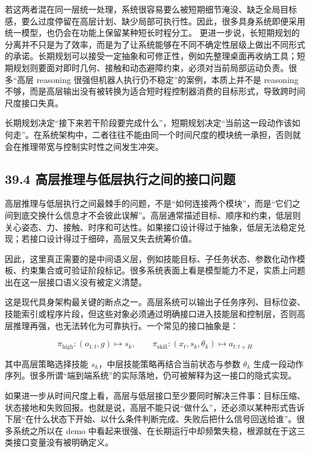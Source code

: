 若这两者混在同一层统一处理，系统很容易要么被短期细节淹没、缺乏全局目标感，要么过度停留在高层计划、缺少局部可执行性。因此，很多具身系统即便采用统一模型，也仍会在功能上保留某种短长时程分工。 更进一步说，长短期规划的分离并不只是为了效率，而是为了让系统能够在不同不确定性层级上做出不同形式的承诺。长期规划可以接受一定抽象和可修正性，例如先整理桌面再收纳工具；短期规划则要面对即时几何、接触和动态避障约束，必须对当前局部运动负责。很多“高层 reasoning 很强但机器人执行仍不稳定”的案例，本质上并不是 reasoning 不够，而是高层输出没有被转换为适合短时程控制器消费的目标形式，导致跨时间尺度接口失真。

长期规划决定“接下来若干阶段要完成什么”，短期规划决定“当前这一段动作该如何走”。在系统架构中，二者往往不能由同一个时间尺度的模块统一承担，否则就会在推理带宽与控制实时性之间发生冲突。

\subsection*{39.4 高层推理与低层执行之间的接口问题}


高层推理与低层执行之间最棘手的问题，不是“如何连接两个模块”，而是“它们之间到底交换什么信息才不会彼此误解”。高层通常描述目标、顺序和约束，低层则关心姿态、力、接触、时序和可达性。如果接口设计得过于抽象，低层无法稳定兑现；若接口设计得过于细碎，高层又失去统筹价值。

因此，这里真正需要的是中间语义层，例如技能目标、子任务状态、参数化动作模板、约束集合或可验证阶段标记。很多系统表面上看是模型能力不足，实质上问题出在这一层接口语义没有被定义清楚。

这是现代具身架构最关键的断点之一。高层系统可以输出子任务序列、目标位姿、技能索引或程序片段，但这些对象必须通过明确接口进入技能层和控制层，否则高层推理再强，也无法转化为可靠执行。一个常见的接口抽象是：

\begingroup
\scriptsize
\begin{equation*}
\pi_{\text{high}}: (o_{1:t}, g) \mapsto s_k, \qquad
\pi_{\text{skill}}: (x_t, s_k, \theta_k) \mapsto a_{t:t+H}
\end{equation*}
\endgroup

其中高层策略选择技能 \(s_k\)，中层技能策略再结合当前状态与参数 \(\theta_k\) 生成一段动作序列。很多所谓“端到端系统”的实际落地，仍可被解释为这一接口的隐式实现。

如果进一步从时间尺度上看，高层与低层接口至少要同时解决三件事：目标压缩、状态接地和失败回报。也就是说，高层不能只说“做什么”，还必须以某种形式告诉下层“在什么状态下开始、以什么条件判断完成、失败后把什么信号回送给谁”。很多系统之所以在 demo 中看起来很强、在长期运行中却频繁失稳，根源就在于这三类接口变量没有被明确定义。

